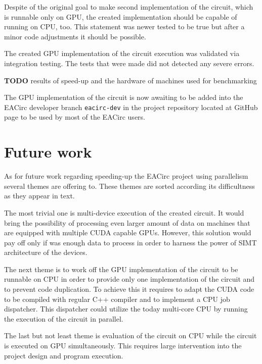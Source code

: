 \documentclass[12pt,oneside]{fithesis2}
\newcommand{\todo}{
	\noindent
	{\large\color{red}\textbf{TODO}}
}
\begin{document}
Despite of the original goal to make second implementation of the circuit, which is runnable only on GPU, the created implementation should be capable of running on CPU, too. This statement was newer tested to be true but after a minor code adjustments it should be possible.

The created GPU implementation of the circuit execution was validated via integration testing. The tests that were made did not detected any severe errors.
 
\bigskip
\todo{results of speed-up and the hardware of machines used for benchmarking}
\bigskip

The GPU implementation of the circuit is now awaiting to be added into the EACirc developer branch \texttt{eacirc-dev} in the project repository located at GitHub page to be used by most of the EACirc users.

\section{Future work}

As for future work regarding speeding-up the EACirc project using parallelism several themes are offering to. These themes are sorted according its difficultness as they appear in text.

The most trivial one is multi-device execution of the created circuit. It would bring the possibility of processing even larger amount of data on machines that are equipped with multiple CUDA capable GPUs. However, this solution would pay off only if was enough data to process in order to harness the power of SIMT architecture of the devices.

The next theme is to work off the GPU implementation of the circuit to be runnable on CPU in order to provide only one implementation of the circuit and to prevent code duplication. To achieve this it requires to adapt the CUDA code to be compiled with regular C++ compiler and to implement a CPU job dispatcher. This dispatcher could utilize the today multi-core CPU by running the execution of the circuit in parallel.

The last but not least theme is evaluation of the circuit on CPU while the circuit is executed on GPU simultaneously. This requires large intervention into the project design and program execution.





\printbibliography[heading=bibintoc]
\end{document}
